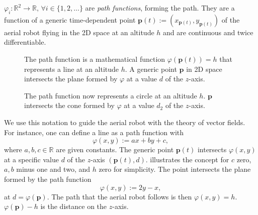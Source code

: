 \begin{defn}
  \label{def:paths}
  $\varphi_i:\mathbb{R}^2\rightarrow\mathbb{R},\,\forall i\in\{1,2,\dots\}$ are \emph{path functions}, forming the path. They are a function of a generic time-dependent point $\mathbf{p}(t):=(x_{\mathbf{p}(t)},y_{\mathbf{p}(t)})$ of the aerial robot flying in the 2D space at an altitude $h$ and are continuous and twice differentiable. 
\end{defn}

\begin{figure}[t!]
  \centering
  
  \caption[Concept of a line as a path function]{The path function is a mathematical function $\varphi(\mathbf{p}(t))=h$ that represents a line at an altitude $h$. A generic point $\mathbf{p}$ in 2D space intersects the plane formed by $\varphi$ at a value $d$ of the $z$-axis.}
  \label{fig:line-pf}
\end{figure}

\begin{figure}[t!]
  \centering
  
  \caption[Concept of a circle as a path function]{The path function now represents a circle at an altitude $h$. $\mathbf{p}$ intersects the cone formed by $\varphi$ at a value $d_2$ of the $z$-axis.}
  \label{fig:circle-pf}
\end{figure}

We use this notation to guide the aerial robot with the theory of vector fields. %
For instance, one can define a line as a path function with
\begin{equation}\label{eq:basic-path}
  \varphi(x,y):=ax+by+c,
\end{equation}
where $a,b,c\in\mathbb{R}$ are given constants. The generic point $\mathbf{p}(t)$ intersects $\varphi(x,y)$ at a specific value $d$ of the $z$-axis $(\mathbf{p}(t),d)$.  illustrates the concept for $c$ zero, $a,b$ minus one and two, and $h$ zero for simplicity. The point intersects the plane formed by the path function
\begin{equation}\label{eq:pathf-line}
  \varphi(x,y):=2y-x,%
\end{equation}
at $d=\varphi(\mathbf{p})$. The path that the aerial robot follows is then $\varphi(x,y)=h$. $\varphi(\mathbf{p})-h$ is the distance on the $z$-axis.

